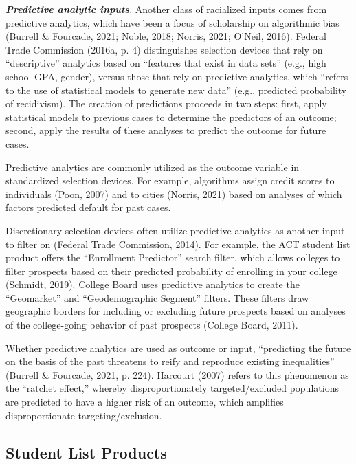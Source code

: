 \documentclass[
  12pt,
]{article}
\begin{document}
\textbf{\emph{Predictive analytic inputs}}. Another class of racialized inputs comes from predictive analytics, which have been a focus of scholarship on algorithmic bias (Burrell \& Fourcade, 2021; Noble, 2018; Norris, 2021; O'Neil, 2016). Federal Trade Commission (2016a, p. 4) distinguishes selection devices that rely on ``descriptive'' analytics based on ``features that exist in data sets'' (e.g., high school GPA, gender), versus those that rely on predictive analytics, which ``refers to the use of statistical models to generate new data'' (e.g., predicted probability of recidivism). The creation of predictions proceeds in two steps: first, apply statistical models to previous cases to determine the predictors of an outcome; second, apply the results of these analyses to predict the outcome for future cases.

Predictive analytics are commonly utilized as the outcome variable in standardized selection devices. For example, algorithms assign credit scores to individuals (Poon, 2007) and to cities (Norris, 2021) based on analyses of which factors predicted default for past cases.

Discretionary selection devices often utilize predictive analytics as another input to filter on (Federal Trade Commission, 2014). For example, the ACT student list product offers the ``Enrollment Predictor'' search filter, which allows colleges to filter prospects based on their predicted probability of enrolling in your college (Schmidt, 2019). College Board uses predictive analytics to create the ``Geomarket'' and ``Geodemographic Segment'' filters. These filters draw geographic borders for including or excluding future prospects based on analyses of the college-going behavior of past prospects (College Board, 2011).

Whether predictive analytics are used as outcome or input, ``predicting the future on the basis of the past threatens to reify and reproduce existing inequalities'' (Burrell \& Fourcade, 2021, p. 224). Harcourt (2007) refers to this phenomenon as the ``ratchet effect,'' whereby disproportionately targeted/excluded populations are predicted to have a higher risk of an outcome, which amplifies disproportionate targeting/exclusion.

\hypertarget{student-list-products}{%
\subsection{Student List Products}\label{student-list-products}}
\end{document}
